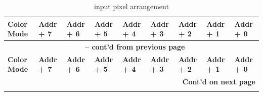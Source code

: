 \documentclass[main\_\_EN.tex]{subfiles}
\begin{document}
\scriptsize
\begin{longtable}[c]{ |p{2cm}|p{1.5cm}|p{1.5cm}|p{1.5cm}|p{1.5cm}|p{1.5cm}|p{1.5cm}|p{1.5cm}|p{1.5cm}| }
    \caption{input pixel arrangement}
    \label{tab:input-pixel-arrangement}\\\hline

    \rowcolor{lightgray}
    \textbf{Color Mode} & \textbf{Addr + 7} & \textbf{Addr + 6} & \textbf{Addr + 5} & \textbf{Addr + 4} & \textbf{Addr + 3} & \textbf{Addr + 2} & \textbf{Addr + 1} & \textbf{Addr + 0} \\\hline
    \endfirsthead


    \multicolumn{9}{c}{\bfseries \tablename\ \thetable{} -- cont'd from previous page}\\\hline
    \rowcolor{lightgray}
    \textbf{Color Mode} & \textbf{Addr + 7} & \textbf{Addr + 6} & \textbf{Addr + 5} & \textbf{Addr + 4} & \textbf{Addr + 3} & \textbf{Addr + 2} & \textbf{Addr + 1} & \textbf{Addr + 0} \\\hline
    \endhead

    \multicolumn{9}{r}{\textbf{Cont'd on next page}} \\
    \endfoot


\end{longtable}
\end{document}
